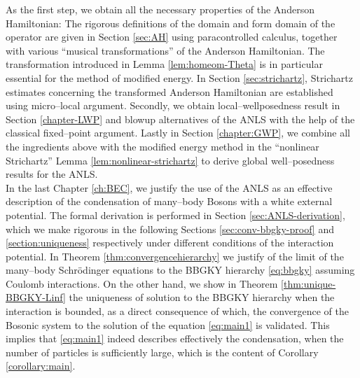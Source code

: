 As the first step, we obtain all the necessary properties of the Anderson Hamiltonian: The rigorous definitions of the domain and form domain of the operator are given in Section \ref{sec:AH} using paracontrolled calculus, together with various ``musical transformations'' of the Anderson Hamiltonian. The transformation introduced in Lemma \ref{lem:homeom-Theta} is in particular essential for the method of modified energy. In Section \ref{sec:strichartz}, Strichartz estimates concerning the transformed Anderson Hamiltonian are established using micro--local argument. Secondly, we obtain local--wellposedness result in Section \ref{chapter-LWP} and blowup alternatives of the ANLS with the help of the classical fixed--point argument. Lastly in Section \ref{chapter:GWP}, we combine all the ingredients above with the modified energy method in the ``nonlinear Strichartz'' Lemma \ref{lem:nonlinear-strichartz} to derive global well--posedness results for the ANLS. \\

In the last Chapter \ref{ch:BEC}, we justify the use of the ANLS as an effective description of the condensation of many--body Bosons with a white external potential. The formal derivation is performed in Section \ref{sec:ANLS-derivation}, which we make rigorous in the following Sections
\ref{sec:conv-bbgky-proof} and \ref{section:uniqueness} respectively under
different conditions of the interaction potential. In Theorem
\ref{thm:convergencehierarchy} we justify of the limit of the many--body Schrödinger equations to
the BBGKY hierarchy \eqref{eq:bbgky} assuming Coulomb interactions. On the other hand, we show in Theorem \ref{thm:unique-BBGKY-Linf} the uniqueness of
solution to the BBGKY hierarchy when the interaction is bounded, as
a direct consequence of which, the convergence of the Bosonic system to the
solution of the equation \eqref{eq:main1} is validated. This implies that
\eqref{eq:main1} indeed describes effectively the condensation, when the number of particles is
sufficiently large, which is the content of Corollary \ref{corollary:main}.\\

\newpage

